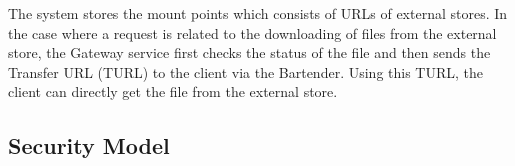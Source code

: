 \documentclass{llncs}
\begin{document}
\begin{itemize}
The system stores the mount points which consists of URLs of external stores. 
In the case where a request is related to the downloading of files from 
the external store, the Gateway service first checks the status of the file
and then sends the Transfer URL (TURL) to the client via the
Bartender. Using this TURL, the client can directly get the file from
the external store. %
\end{itemize}

\subsection{Security Model }
\label{Security Model }
\end{document}
